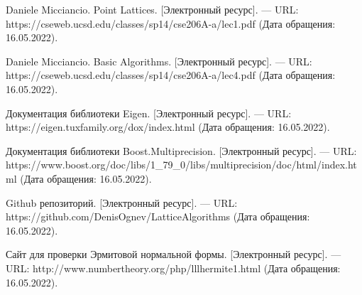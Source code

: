 \newpage


\begin{thebibliography}{4}

Daniele Micciancio. Point Lattices. [Электронный ресурс]. --- URL: https://cseweb.ucsd.edu/classes/sp14/cse206A-a/lec1.pdf (Дата обращения: 16.05.2022).

Daniele Micciancio. Basic Algorithms. [Электронный ресурс]. --- URL: https://cseweb.ucsd.edu/classes/sp14/cse206A-a/lec4.pdf (Дата обращения: 16.05.2022).

Документация библиотеки Eigen. [Электронный ресурс]. --- URL: https://eigen.tuxfamily.org/dox/index.html (Дата обращения: 16.05.2022).

Документация библиотеки Boost.Multiprecision. [Электронный ресурс]. --- URL: https://www.boost.org/doc/libs/1\_79\_0/libs/multiprecision/doc/html/index.html (Дата обращения: 16.05.2022).

Github репозиторий. [Электронный ресурс]. --- URL: https://github.com/DenisOgnev/LatticeAlgorithms (Дата обращения: 16.05.2022).

Сайт для проверки Эрмитовой нормальной формы. [Электронный ресурс]. --- URL: http://www.numbertheory.org/php/lllhermite1.html (Дата обращения: 16.05.2022). 

\end{thebibliography}

\clearpage